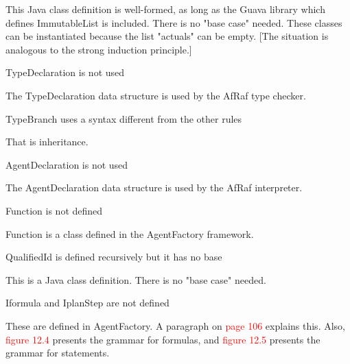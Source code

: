 \documentclass{article}
\newcommand*\R[1]{\textcolor{red}{#1}} %
\newenvironment{them}{\noindent\begingroup\color{blue}}{\endgroup\par}
\begin{document}
This Java class definition is well-formed, as long as the Guava library which
defines ImmutableList is included. There is no "base case" needed. These
classes can be instantiated because the list "actuals" can be empty. [The
situation is analogous to the strong induction principle.]

\begin{them}

TypeDeclaration is not used 

\end{them}
The TypeDeclaration data structure is used by the AfRaf type checker.

\begin{them}

TypeBranch uses a syntax different from the other rules 

\end{them}
That is inheritance. 

\begin{them}

AgentDeclaration is not used 

\end{them}
The AgentDeclaration data structure is used by the AfRaf interpreter.

\begin{them}

Function is not defined 

\end{them}
Function is a class defined in the AgentFactory framework.

\begin{them}

QualifiedId is defined recursively but it has no base

\end{them}
This is a Java class definition. There is no "base case" needed.

\begin{them}

Iformula and IplanStep are not defined

\end{them}
These are defined in AgentFactory. A paragraph on \R{page 106}  explains this.
Also, \R{figure 12.4} presents the grammar for formulas, and \R{figure 12.5}
presents the grammar for statements.
\end{document}
